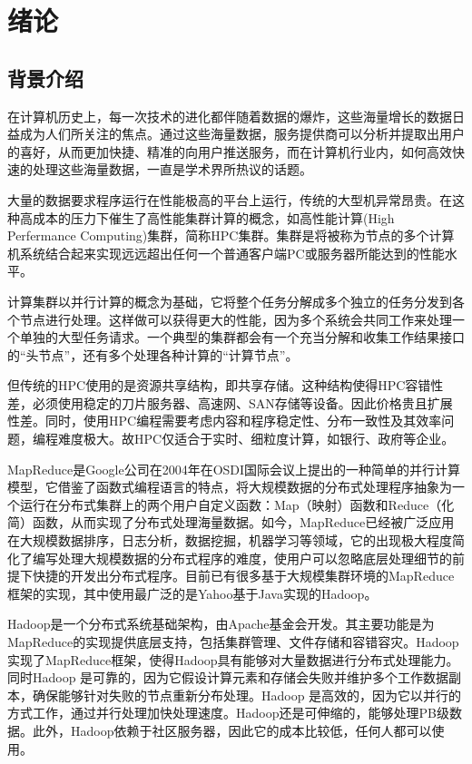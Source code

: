 \chapter{绪论}
\label{chap:1}

\section{背景介绍}

在计算机历史上，每一次技术的进化都伴随着数据的爆炸，这些海量增长的数据日益成为人们所关注的焦点。通过这些海量数据，服务提供商可以分析并提取出用户的喜好，从而更加快捷、精准的向用户推送服务，而在计算机行业内，如何高效快速的处理这些海量数据，一直是学术界所热议的话题。

大量的数据要求程序运行在性能极高的平台上运行，传统的大型机异常昂贵。在这种高成本的压力下催生了高性能集群计算的概念，如高性能计算(High Perfermance Computing)集群，简称HPC集群。集群是将被称为节点的多个计算机系统结合起来实现远远超出任何一个普通客户端PC或服务器所能达到的性能水平。

计算集群以并行计算的概念为基础，它将整个任务分解成多个独立的任务分发到各个节点进行处理。这样做可以获得更大的性能，因为多个系统会共同工作来处理一个单独的大型任务请求。一个典型的集群都会有一个充当分解和收集工作结果接口的“头节点”，还有多个处理各种计算的“计算节点”。

但传统的HPC使用的是资源共享结构，即共享存储。这种结构使得HPC容错性差，必须使用稳定的刀片服务器、高速网、SAN存储等设备。因此价格贵且扩展性差。同时，使用HPC编程需要考虑内容和程序稳定性、分布一致性及其效率问题，编程难度极大。故HPC仅适合于实时、细粒度计算，如银行、政府等企业。

MapReduce是Google公司在2004年在OSDI国际会议上提出的一种简单的并行计算模型，它借鉴了函数式编程语言的特点，将大规模数据的分布式处理程序抽象为一个运行在分布式集群上的两个用户自定义函数：Map（映射）函数和Reduce（化简）函数，从而实现了分布式处理海量数据。如今，MapReduce已经被广泛应用在大规模数据排序，日志分析，数据挖掘，机器学习等领域，它的出现极大程度简化了编写处理大规模数据的分布式程序的难度，使用户可以忽略底层处理细节的前提下快捷的开发出分布式程序。目前已有很多基于大规模集群环境的MapReduce框架的实现，其中使用最广泛的是Yahoo基于Java实现的Hadoop。

Hadoop是一个分布式系统基础架构，由Apache基金会开发。其主要功能是为MapReduce的实现提供底层支持，包括集群管理、文件存储和容错容灾。Hadoop 实现了MapReduce框架，使得Hadoop具有能够对大量数据进行分布式处理能力。同时Hadoop 是可靠的，因为它假设计算元素和存储会失败并维护多个工作数据副本，确保能够针对失败的节点重新分布处理。Hadoop 是高效的，因为它以并行的方式工作，通过并行处理加快处理速度。Hadoop还是可伸缩的，能够处理PB级数据。此外，Hadoop依赖于社区服务器，因此它的成本比较低，任何人都可以使用。

